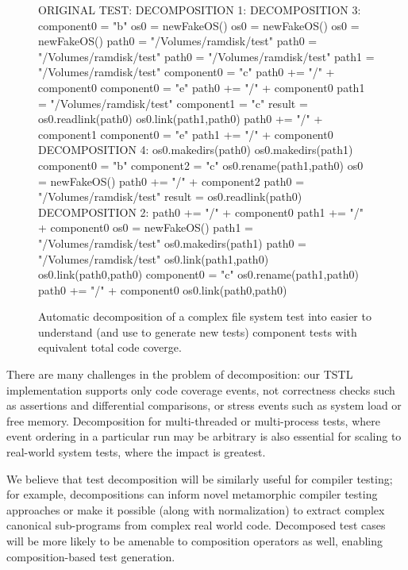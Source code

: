 \begin{figure}
{\scriptsize
\begin{code}
ORIGINAL TEST:                         DECOMPOSITION 1:                      DECOMPOSITION 3:
component0 = "b"                       os0 = newFakeOS()                     os0 = newFakeOS()
os0 = newFakeOS()                      path0 = "/Volumes/ramdisk/test"       path0 = "/Volumes/ramdisk/test"
path0 = "/Volumes/ramdisk/test"        path1 = "/Volumes/ramdisk/test"       component0 = "c"
path0 += "/" + component0              component0 = "e"                      path0 += "/" + component0
path1 = "/Volumes/ramdisk/test"        component1 = "c"                      result = os0.readlink(path0)
os0.link(path1,path0)                  path0 += "/" + component1 
component0 = "e"                       path1 += "/" + component0             DECOMPOSITION 4:
os0.makedirs(path0)                    os0.makedirs(path1)                   component0 = "b" 
component2 = "c"                       os0.rename(path1,path0)               os0 = newFakeOS()
path0 += "/" + component2                                                    path0 = "/Volumes/ramdisk/test" 
result = os0.readlink(path0)           DECOMPOSITION 2:                      path0 += "/" + component0
path1 += "/" + component0              os0 = newFakeOS()                     path1 = "/Volumes/ramdisk/test"
os0.makedirs(path1)                    path0 = "/Volumes/ramdisk/test"       os0.link(path1,path0)
os0.link(path0,path0)                  component0 = "c"
os0.rename(path1,path0)                path0 += "/" + component0
                                       os0.link(path0,path0)
\end{code}
}
\label{fig:decompfs}
\caption{Automatic decomposition of a complex file system test into easier to understand (and use to generate new tests) component tests with equivalent total code coverge.}
\end{figure}

There are many challenges in the problem of decomposition:  our TSTL implementation supports only code coverage events, not correctness checks such as assertions and differential comparisons, or stress events such as system load or free memory.  Decomposition for multi-threaded or multi-process tests, where event ordering in a particular run may be arbitrary is also essential for scaling to real-world system tests, where the impact is greatest.

We believe that test decomposition will be similarly useful for
compiler testing; for example, decompositions can inform novel metamorphic \cite{MetaTest} compiler testing approaches \cite{ZhendongPLDI14} or make it possible (along with normalization) to extract complex canonical sub-programs \cite{ZhendongPLDI17} from complex real world code.
%
Decomposed test cases will be more likely to be amenable to composition
operators as well, enabling composition-based test generation.

